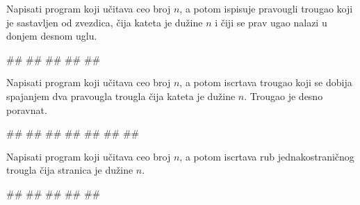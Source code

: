 \begin{Exercise}[label=p1.7_] 
Napisati program koji učitava ceo broj $n$, a potom ispisuje pravougli
trougao koji je sastavljen od zvezdica, čija kateta je dužine $n$ i čiji se prav ugao nalazi u  donjem desnom uglu. 


\begin{miditest}
\begin{upotreba}{1}
#\naslovInt#
##
#\izlaz{\ \ *}#
#\izlaz{\ ***}#
#\izlaz{*****}#
\end{upotreba}
\end{miditest}
\end{Exercise}
\begin{Answer}[ref=p1.7_]
\end{Answer}

\begin{Exercise}[label=p1.7_] 
Napisati program koji učitava ceo broj $n$, a potom iscrtava trougao
koji se dobija spajanjem dva pravougla trougla čija kateta je dužine
$n$. Trougao je desno poravnat.


\begin{miditest}
\begin{upotreba}{1}
#\naslovInt#
##
#\izlaz{\ \ *}#
#\izlaz{\ ***}#
#\izlaz{*****}#
#\izlaz{\ ***}#
#\izlaz{\ \ *}#
\end{upotreba}
\end{miditest}
\end{Exercise}
\begin{Answer}[ref=p1.7_]
\end{Answer}


\begin{Exercise}[label=p1.7_] 
Napisati program koji učitava ceo broj $n$, a potom iscrtava
rub jednakostraničnog trougla čija stranica je dužine $n$.

\begin{miditest}
\begin{upotreba}{1}
#\naslovInt#
##
#\izlaz{\ \ *}#
#\izlaz{\ *\ *}#
#\izlaz{*\ *\ *}#
\end{upotreba}
\end{miditest}
\end{Exercise}
\begin{Answer}[ref=p1.7_]
\end{Answer}

